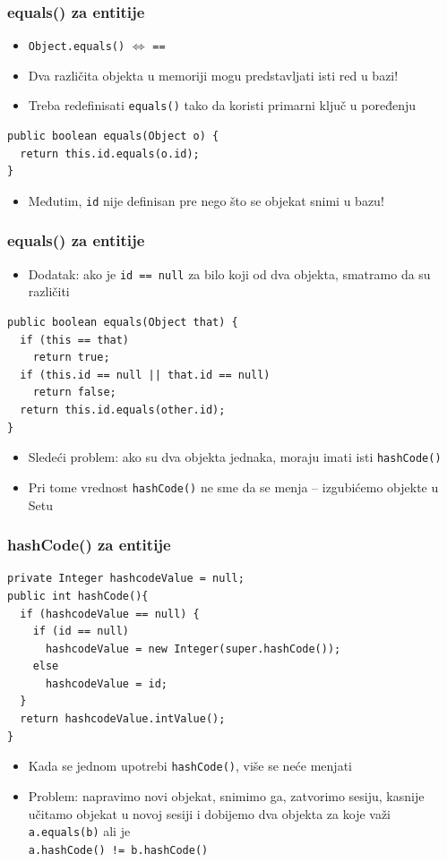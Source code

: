 \documentclass[compress]{beamer}
\begin{document}
\begin{frame}[fragile]
  \frametitle{equals() za entitije}
  \begin{itemize}
    \item \texttt{Object.equals()} $\Leftrightarrow$ \texttt{==}
    \item Dva različita objekta u memoriji mogu predstavljati isti red u bazi!
    \item Treba redefinisati \texttt{equals()} tako da koristi primarni ključ u poređenju
  \end{itemize}
\begin{verbatim}
public boolean equals(Object o) {
  return this.id.equals(o.id);
}
\end{verbatim}
  \begin{itemize}
    \item<2-> Međutim, \texttt{id} nije definisan pre nego što se objekat snimi u bazu!
  \end{itemize}
\end{frame}
\begin{frame}[fragile]
  \frametitle{equals() za entitije}
  \begin{itemize}
    \item Dodatak: ako je \texttt{id == null} za bilo koji od dva objekta, smatramo da su različiti
  \end{itemize}
\begin{verbatim}
public boolean equals(Object that) {
  if (this == that) 
    return true;
  if (this.id == null || that.id == null)
    return false;
  return this.id.equals(other.id);
}
\end{verbatim}
  \begin{itemize}
    \item<2-> Sledeći problem: ako su dva objekta jednaka, moraju imati isti \texttt{hashCode()}
    \item<2-> Pri tome vrednost \texttt{hashCode()} ne sme da se menja -- izgubićemo objekte u Setu
  \end{itemize}
\end{frame}
\begin{frame}[fragile]
  \frametitle{hashCode() za entitije}
\begin{verbatim}
private Integer hashcodeValue = null;
public int hashCode(){
  if (hashcodeValue == null) {
    if (id == null)
      hashcodeValue = new Integer(super.hashCode());
    else
      hashcodeValue = id;
  }
  return hashcodeValue.intValue();
}
\end{verbatim}
  \begin{itemize}
    \item Kada se jednom upotrebi \texttt{hashCode()}, više se neće menjati
    \item<2-> Problem: napravimo novi objekat, snimimo ga, zatvorimo sesiju, kasnije učitamo objekat u novoj sesiji 
      i dobijemo dva objekta za koje važi \texttt{a.equals(b)} ali je \\ \texttt{a.hashCode() != b.hashCode()}
  \end{itemize}
\end{frame}
\end{document}
